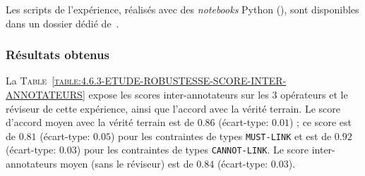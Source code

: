 			\begin{leftBarInformation}
				Les scripts de l'expérience, réalisés avec des \textit{notebooks} Python (\cite{van-rossum-drake:2009:python-reference-manual}), sont disponibles dans un dossier dédié de~\cite{schild:2021:cognitivefactory-interactiveclusteringcomparativestudy}.
			\end{leftBarInformation}
			
		\subsubsection{Résultats obtenus}
		
			La \textsc{Table~\ref{table:4.6.3-ETUDE-ROBUSTESSE-SCORE-INTER-ANNOTATEURS}} expose les scores inter-annotateurs sur les $3$ opérateurs et le réviseur de cette expérience, ainsi que l'accord avec la vérité terrain.
			Le score d'accord moyen avec la vérité terrain est de $0.86$ (écart-type: $0.01$) ; ce score est de $0.81$ (écart-type: $0.05$) pour les contraintes de types \texttt{MUST-LINK} et est de $0.92$ (écart-type: $0.03$) pour les contraintes de types \texttt{CANNOT-LINK}.
			Le score inter-annotateurs moyen (sans le réviseur) est de $0.84$ (écart-type: $0.03$).
			
